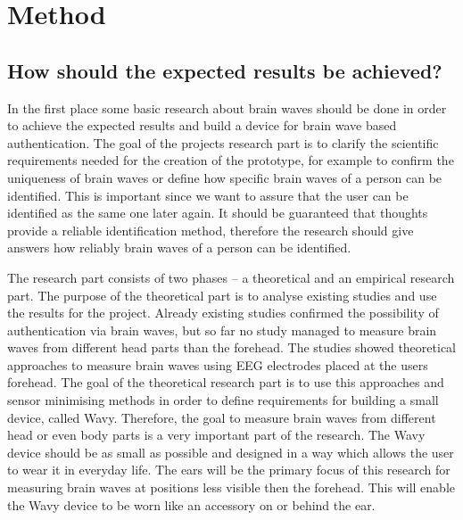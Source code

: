\section{Method}
\label{sect:method}
\subsection{How should the expected results be achieved?}
In the first place some basic research about brain waves should be done in order to achieve the expected results and build a device for brain wave based authentication. The goal of the projects research part is to clarify the scientific requirements needed for the creation of the prototype, for example to confirm the uniqueness of brain waves or define how specific brain waves of a person can be identified. This is important since we want to assure that the user can be identified as the same one later again. It should be guaranteed that thoughts provide a reliable identification method, therefore the research should give answers how reliably brain waves of a person can be identified.

The research part consists of two phases – a theoretical and an empirical research part. The purpose of the theoretical part is to analyse existing studies and use the results for the project. Already existing studies confirmed the possibility of authentication via brain waves, but so far no study managed to measure brain waves from different head parts than the forehead. The studies showed theoretical approaches to measure brain waves using EEG electrodes placed at the users forehead. The goal of the theoretical research part is to use this approaches and sensor minimising methods in order to define requirements for building a small device, called Wavy. Therefore, the goal to measure brain waves from different head or even body parts is a very important part of the research. The Wavy device should be as small as possible and designed in a way which allows the user to wear it in everyday life. The ears will be the primary focus of this research for measuring brain waves at positions less visible then the forehead. This will enable the Wavy device to be worn like an accessory on or behind the ear. 

